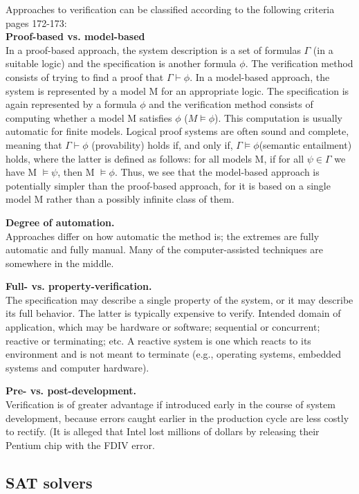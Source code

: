 Approaches to verification can be classified according to the following criteria \cite{HuthR1} pages 172-173:\\
\textbf{Proof-based vs. model-based}\\
In a proof-based approach, the system description 
is a set of formulas $\Gamma$ (in a suitable logic) and the specification is another formula $\phi$. 
The verification method consists of trying to find a proof that $\Gamma \vdash \phi$. 
In a model-based approach, the system is represented by a model M for an appropriate logic.
The specification is again represented by a formula $\phi$ and the verification method consists 
of computing whether a model M satisfies $\phi$ ($M \models \phi$). This computation is usually automatic
for finite models. Logical proof systems are often sound and complete, meaning that $\Gamma \vdash \phi$ (provability) holds if, and only
if, $\Gamma\models\phi$(semantic entailment) holds, where the latter is defined 
as follows: 
for all models M, if for all $\psi \in \Gamma$ we have M $\models\psi$, then M $\models\phi$.
Thus, we see that the model-based approach is potentially simpler than
the proof-based approach, for it is based on a single model M rather
than a possibly infinite class of them.

\textbf{Degree of automation. }\\ 
Approaches differ on how automatic the method is; 
the extremes are fully automatic and fully manual. Many
of the computer-assisted techniques are somewhere in the middle.

\textbf{Full- vs. property-verification.}\\ 
The specification may describe a single property of the system, or it may describe its full behavior. 
The latter is typically expensive to verify.
Intended domain of application, which may be hardware or software;
sequential or concurrent; reactive or terminating; etc. A reactive system
is one which reacts to its environment and is not meant to terminate
(e.g., operating systems, embedded systems and computer hardware).

\textbf{Pre- vs. post-development. }\\ 
Verification is of greater advantage if introduced early in the course of system development, because errors
caught earlier in the production cycle are less costly to rectify. (It is
alleged that Intel lost millions of dollars by releasing their Pentium chip with the FDIV error.


\subsection {SAT solvers}

